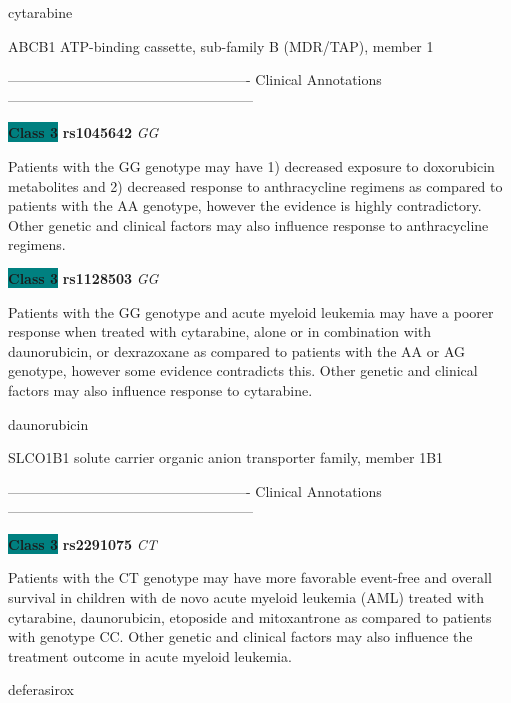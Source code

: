 \documentclass{resume} %
\begin{document}
\begin{rSection}{ cytarabine }
\begin{rSubsection}{ ABCB1 }{ ATP-binding cassette, sub-family B (MDR/TAP), member 1 }{}{}
\item[] ---------------------------------------------------- Clinical Annotations -----------------------------------------------------\newline
\item \textbf{\colorbox{teal} {Class 3}} \textbf{ rs1045642 } \textit{ GG }
\item[] Patients with the GG genotype may have 1) decreased exposure to doxorubicin metabolites and 2) decreased response to anthracycline regimens as compared to patients with the AA genotype, however the evidence is highly contradictory. Other genetic and clinical factors may also influence response to anthracycline regimens.\item \textbf{\colorbox{teal} {Class 3}} \textbf{ rs1128503 } \textit{ GG }
\item[] Patients with the GG genotype and acute myeloid leukemia may have a poorer response when treated with cytarabine, alone or in combination with daunorubicin, or dexrazoxane as compared to patients with the AA or AG genotype, however some evidence contradicts this. Other genetic and clinical factors may also influence response to cytarabine.
\end{rSubsection}

\end{rSection}\begin{rSection}{ daunorubicin }
\item[]

\begin{rSubsection}{ SLCO1B1 }{ solute carrier organic anion transporter family, member 1B1 }{}{}
\item[]

\item[] ---------------------------------------------------- Clinical Annotations -----------------------------------------------------\newline
\item \textbf{\colorbox{teal} {Class 3}} \textbf{ rs2291075 } \textit{ CT }
\item[] Patients with the CT genotype may have more favorable event-free and overall survival in children with de novo acute myeloid leukemia (AML) treated with cytarabine, daunorubicin, etoposide and mitoxantrone as compared to patients with genotype CC. Other genetic and clinical factors may also influence the treatment outcome in acute myeloid leukemia.
\end{rSubsection}

\end{rSection}\begin{rSection}{ deferasirox }
\item[]


\end{rSection}
\end{document}
